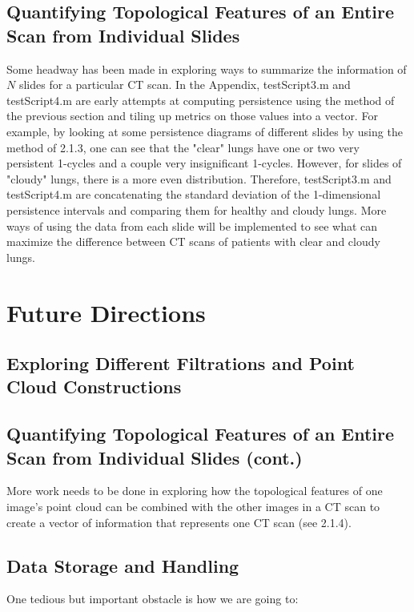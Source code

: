 \documentclass[12pt]{report}
\begin{document}
\subsection{Quantifying Topological Features of an Entire Scan from Individual Slides}

Some headway has been made in exploring ways to summarize the information of $N$ slides for a particular CT scan. In the Appendix, testScript3.m and testScript4.m are early attempts at computing persistence using the method of the previous section and tiling up metrics on those values into a vector. For example, by looking at some persistence diagrams of different slides by using the method of 2.1.3, one can see that the "clear" lungs have one or two very persistent 1-cycles and a couple very insignificant 1-cycles. However, for slides of "cloudy" lungs, there is a more even distribution. Therefore, testScript3.m and testScript4.m are concatenating the standard deviation of the 1-dimensional persistence intervals and comparing them for healthy and cloudy lungs. More ways of using the data from each slide will be implemented to see what can maximize the difference between CT scans of patients with clear and cloudy lungs.

\section{Future Directions}

\subsection{Exploring Different Filtrations and Point Cloud Constructions}

\subsection{Quantifying Topological Features of an Entire Scan from Individual Slides (cont.)}

More work needs to be done in exploring how the topological features of one image's point cloud can be combined with the other images in a CT scan to create a vector of information that represents one CT scan (see 2.1.4).

\subsection{Data Storage and Handling}

One tedious but important obstacle is how we are going to:\newline
\end{document}
